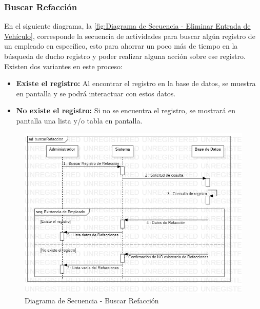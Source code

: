 \subsubsection{Buscar Refacción}
En el siguiente diagrama, la \ref{fig:Diagrama de Secuencia - Eliminar Entrada de Vehículo}, corresponde la secuencia de actividades para buscar algún registro de un empleado en específico, esto para ahorrar un poco más de tiempo en la búsqueda de ducho registro y poder realizar alguna acción sobre ese registro. Existen dos variantes en este proceso:
\begin{itemize}
	\item \textbf{Existe el registro:} Al encontrar el registro en la base de datos, se muestra en pantalla y se podrá interactuar con estos datos.
	\item \textbf{No existe el registro:} Si no se encuentra el registro, se mostrará en pantalla una lista y/o tabla en pantalla.
\end{itemize}
\begin{figure}[!h]
	\centering
	\includegraphics[width=1\textwidth]{./diseno/vprocesos/imagenes/buscarRefaccion}
	\caption{Diagrama de Secuencia - Buscar Refacción}
	\label{fig:Diagrama de Secuencia - Buscar Refaccion}
\end{figure}
\clearpage
